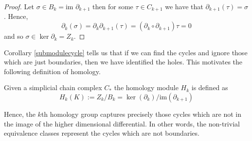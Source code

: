 \begin{proof}
Let $\sigma \in B_{k} = \textrm{im } \partial_{k+1}$ then for some $\tau \in C_{k+1}$ we have that $\partial_{k+1}(\tau)=\sigma$. Hence,
\[ \partial_{k}(\sigma) = \partial_{k} \partial_{k+1}(\tau) = (\partial_{k} \circ \partial_{k+1}) \tau = 0\]
and so $\sigma \in \ker \partial_{k} = Z_{k}$.
\end{proof}

 Corollary \ref{submodulecycle} tells us that if we can find the cycles and ignore those which are just boundaries, then we have identified the holes. This motivates the following definition of homology.
\begin{definition}
  Given a simplicial chain complex \hspace{0.05cm}$C_{*}$ the homology module $H_{k}$ is defined as
  \[H_{k}(K) := Z_{k} / B_{k} = \ker(\partial_{k})/\text{im}(\partial_{k+1})\]
\end{definition}
Hence, the $k$th homology group captures precisely those cycles which are not in the image of the higher dimensional differential. In other words, the non-trivial equivalence classes represent the cycles which are not boundaries.
